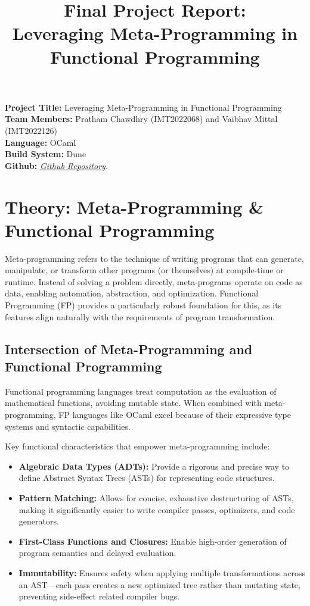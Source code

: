 \documentclass[12pt]{article}
\title{\textbf{Final Project Report:\\ Leveraging Meta-Programming in Functional Programming}}
\author{}
\date{}
\begin{document}
\maketitle

\noindent
\textbf{Project Title:} Leveraging Meta-Programming in Functional Programming \\
\textbf{Team Members:} Pratham Chawdhry (IMT2022068) and Vaibhav Mittal (IMT2022126) \\
\textbf{Language:} OCaml \\
\textbf{Build System:} Dune \\
\textbf{Github: } 
\href{https://github.com/Vaibhavvv24/PL_Project_MP/tree/main}{\textit{Github Repository}}.

\vspace{1em}

\section{Theory: Meta-Programming \& Functional Programming}

Meta-programming refers to the technique of writing programs that can generate, manipulate, or transform other programs (or themselves) at compile-time or runtime. Instead of solving a problem directly, meta-programs operate on code as data, enabling automation, abstraction, and optimization. Functional Programming (FP) provides a particularly robust foundation for this, as its features align naturally with the requirements of program transformation.

\subsection{Intersection of Meta-Programming and Functional Programming}
Functional programming languages treat computation as the evaluation of mathematical functions, avoiding mutable state. When combined with meta-programming, FP languages like OCaml excel because of their expressive type systems and syntactic capabilities.

Key functional characteristics that empower meta-programming include:
\begin{itemize}
    \item \textbf{Algebraic Data Types (ADTs):} Provide a rigorous and precise way to define Abstract Syntax Trees (ASTs) for representing code structures.
    \item \textbf{Pattern Matching:} Allows for concise, exhaustive destructuring of ASTs, making it significantly easier to write compiler passes, optimizers, and code generators.
    \item \textbf{First-Class Functions and Closures:} Enable high-order generation of program semantics and delayed evaluation.
    \item \textbf{Immutability:} Ensures safety when applying multiple transformations across an AST---each pass creates a new optimized tree rather than mutating state, preventing side-effect related compiler bugs.
\end{itemize}
\end{document}
